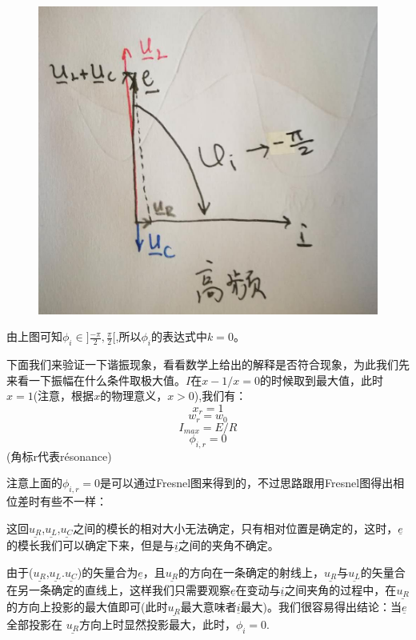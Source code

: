 \documentclass[12pt]{book}
\theoremstyle{definition}\newtheorem{dfn}{Définition}[chapter]
\theoremstyle{plain}\newtheorem{thm}{Théorème}[chapter]
\theoremstyle{plain}\newtheorem{prp}{Proposition}[chapter]
\theoremstyle{plain}\newtheorem{lem}{\bf Lemme}[chapter]
\theoremstyle{plain}\newtheorem{axm}{\bf Axiome}[chapter]
\theoremstyle{plain}\newtheorem{lmm}{\bf Lemme}[chapter]
\theoremstyle{plain}\newtheorem{cor}{\bf Corollaire}[chapter]
\theoremstyle{remark}\newtheorem{rem}{Remarque}[chapter]
\begin{document}
\begin{figure}[H]
	\centering
	\includegraphics[scale=0.2]{image//Etude du circuit RLC serie-Resonances//5}
\end{figure}
由上图可知$\phi_{i}\in ]\frac{-\pi}{2},\frac{\pi}{2}[$,所以$\phi_{i}$的表达式中$k=0$。

下面我们来验证一下谐振现象，看看数学上给出的解释是否符合现象，为此我们先来看一下振幅在什么条件取极大值。$I$在$x-1/x=0$的时候取到最大值，此时$x=1$(注意，根据$x$的物理意义，$x>0$),我们有：
$$
x_r=1
$$
$$
w_r=w_0
$$
$$
I_{max}=E/R
$$
$$
\phi_{i,r}=0
$$
\quad \quad \quad \quad \quad \quad \quad \quad \quad \quad \quad \quad (角标r代表résonance)

注意上面的$\phi_{i,r}=0$是可以通过Fresnel图来得到的，不过思路跟用Fresnel图得出相位差时有些不一样：

这回$\underline{u_R}$,$\underline{u_L}$,$\underline{u_C}$之间的模长的相对大小无法确定，只有相对位置是确定的，这时，$\underline{e}$的模长我们可以确定下来，但是与$\underline{i}$之间的夹角不确定。

由于($\underline{u_R}$,$\underline{u_L}$.$\underline{u_C}$)的矢量合为$\underline{e}$，且$\underline{u_R}$的方向在一条确定的射线上，$\underline{u_R}$与$\underline{u_L}$的矢量合在另一条确定的直线上，这样我们只需要观察$\underline{e}$在变动与$\underline{i}$之间夹角的过程中，在$\underline{u_R}$的方向上投影的最大值即可(此时$\underline{u_R}$最大意味者$\underline{i}$最大)。我们很容易得出结论：当$\underline{e}$全部投影在
$\underline{u_R}$方向上时显然投影最大，此时，$\phi_{i}=0$.
\end{document}
